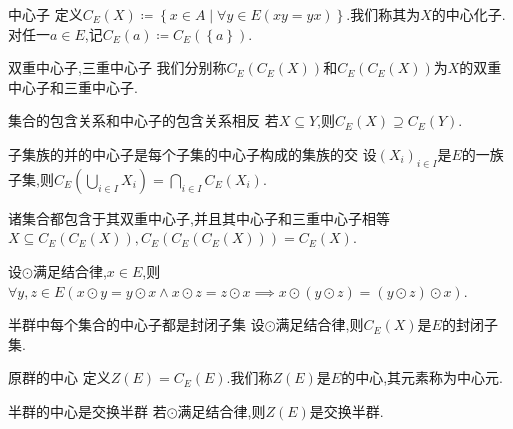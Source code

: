 \begin{definition}{中心子}{}
	定义$C_{E}\left(X\right)\coloneq\left\{x\in A\middle|\forall y\in E\left(xy=yx\right)\right\}$.我们称其为$X$的中心化子.对任一$a\in E$,记$C_{E}\left(a\right)\coloneq C_{E}\left(\left\{a\right\}\right)$.
\end{definition}

\begin{definition}{双重中心子,三重中心子}{}
	我们分别称$C_{E}\left(C_{E}\left(X\right)\right)$和$C_{E}\left(C_{E}\left(X\right)\right)$为$X$的双重中心子和三重中心子.
\end{definition}

\begin{proposition}{集合的包含关系和中心子的包含关系相反}{}
	若$X\subseteq Y$,则$C_{E}\left(X\right)\supseteq C_{E}\left(Y\right)$.
\end{proposition}

\begin{proposition}{子集族的并的中心子是每个子集的中心子构成的集族的交}{}
	设$\left(X_{i}\right)_{i\in I}$是$E$的一族子集,则$C_{E}\left(\bigcup\limits_{i\in I}X_{i}\right)=\bigcap\limits_{i\in I}C_{E}\left(X_{i}\right)$.
\end{proposition}

\begin{proposition}{诸集合都包含于其双重中心子,并且其中心子和三重中心子相等}{}
	$X\subseteq C_{E}\left(C_{E}\left(X\right)\right),C_{E}\left(C_{E}\left(C_{E}\left(X\right)\right)\right)=C_{E}\left(X\right)$.
\end{proposition}

\begin{proposition}{}{}
	设$\odot$满足结合律,$x\in E$,则$\forall y,z\in E\left(x\odot y=y\odot x\wedge x\odot z=z\odot x\implies x\odot\left(y\odot z\right)=\left(y\odot z\right)\odot x\right)$.
\end{proposition}

\begin{corollary}{半群中每个集合的中心子都是封闭子集}{}
	设$\odot$满足结合律,则$C_{E}\left(X\right)$是$E$的封闭子集.
\end{corollary}

\begin{definition}{原群的中心}{}
	定义$Z\left(E\right)=C_{E}\left(E\right)$.我们称$Z\left(E\right)$是$E$的中心,其元素称为中心元.
\end{definition}

\begin{proposition}{半群的中心是交换半群}{}
	若$\odot$满足结合律,则$Z\left(E\right)$是交换半群.
\end{proposition}

